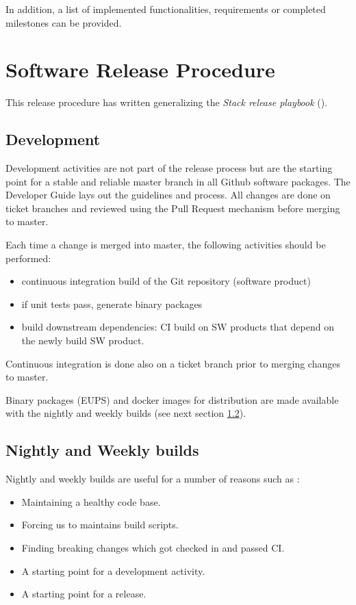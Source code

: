 In addition, a list of implemented functionalities, requirements or completed milestones can be provided.


\newpage
\section{Software Release Procedure} \label{sec:releaseprocedure}

This release procedure has written generalizing the \textit{Stack release playbook} ().

\subsection{Development} \label{sec:dev}

Development activities are not part of the release process but are the starting point for a stable and reliable master branch in all Github software packages.
The Developer Guide lays out the guidelines and process. All changes are done on ticket branches and reviewed using the Pull Request mechanism before merging to master.

Each time a change is merged into master, the following activities should be performed:

\begin{itemize}
\item continuous integration build of the Git repository (software product)
\item if unit tests pass, generate binary packages
\item build downstream dependencies: CI build on SW products that depend on the newly build SW product.
\end{itemize}

Continuous integration is done also on a ticket branch prior to merging changes to master. 

Binary packages (EUPS) and docker images for distribution are made available with the nightly and weekly builds (see next section \ref{sec:weekly}).


\subsection{Nightly and Weekly builds} \label{sec:weekly}

Nightly and weekly builds are  useful for a number of reasons such as :
\begin{itemize}
	\item Maintaining a healthy code base.
	\item Forcing us to maintains build scripts.
	\item Finding breaking changes which got checked in and passed CI.
	\item A starting point for a development activity.
	\item A starting point for a release.
\end{itemize}


